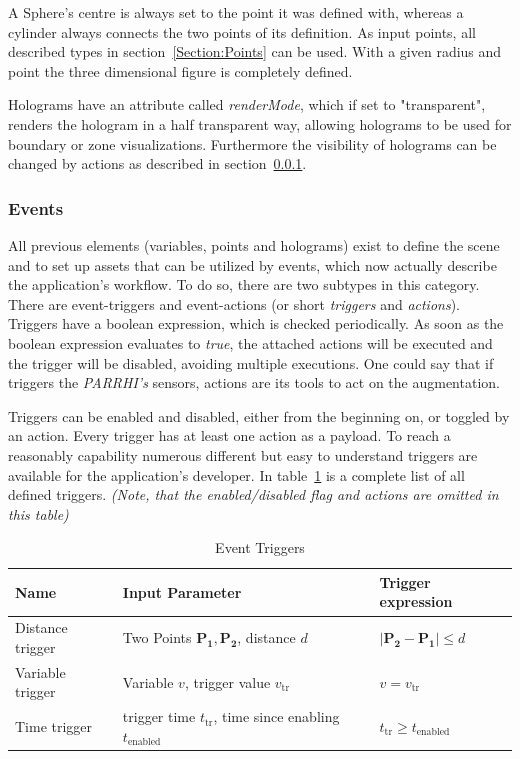 A Sphere's centre is always set to the point it was defined with, whereas a cylinder always connects the two points of its definition. As input points, all described types in section~\ref{Section:Points} can be used. With a given radius and point the three dimensional figure is completely defined.

Holograms have an attribute called \textit{renderMode}, which if set to "transparent", renders the hologram in a half transparent way, allowing holograms to be used for boundary or zone visualizations. Furthermore the visibility of holograms can be changed by actions as described in section~\ref{Section:Events}.

\subsubsection{Events}\label{Section:Events}
All previous elements (variables, points and holograms) exist to define the scene and to set up assets that can be utilized by events, which now actually describe the application's workflow. To do so, there are two subtypes in this category. There are event-triggers and event-actions (or short \textit{triggers} and \textit{actions}). Triggers have a boolean expression, which is checked periodically. As soon as the boolean expression evaluates to \textit{true}, the attached actions will be executed and the trigger will be disabled, avoiding multiple executions. One could say that if triggers the \textit{PARRHI's} sensors, actions are its tools to act on the augmentation. 

Triggers can be enabled and disabled, either from the beginning on, or toggled by an action. Every trigger has at least one action as a payload. To reach a reasonably capability numerous different but easy to understand triggers are available for the application's developer. In table~\ref{Table:Triggers} is a complete list of all defined triggers. \textit{(Note, that the enabled/disabled flag and actions are omitted in this table)}

 
 \begin{table}
 	\caption{Event Triggers}
 	\label{Table:Triggers}
 	\centering
 	\begin{tabular}{lll}
 		\toprule
 		Name & Input Parameter		& Trigger expression	\\		
 		\midrule
 		Distance trigger & Two Points $\boldsymbol{P_1}, \boldsymbol{P_2}$, distance $d$		&  $|\boldsymbol{P_2}-\boldsymbol{P_1}| \le d$ \\
		Variable trigger & Variable $v$, trigger value $v_{\text{tr}}$ 		& $v = v_{\text{tr}}$	 \\
		Time trigger & trigger time $t_{\text{tr}}$, time since enabling $t_{\text{enabled}}$ & $t_{\text{tr}} \geq t_{\text{enabled}}$\\
		\bottomrule
	\end{tabular}
\end{table}

